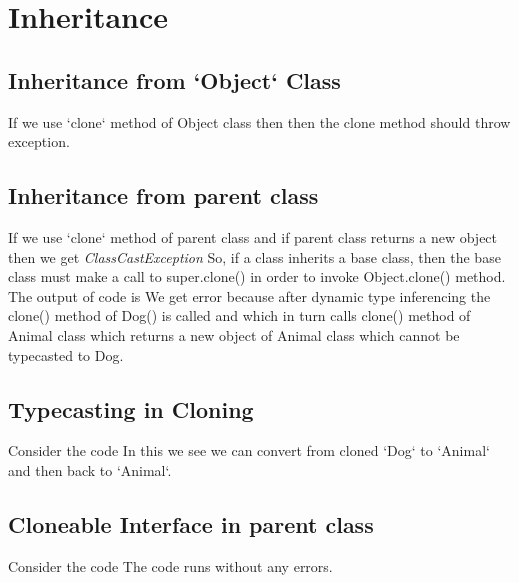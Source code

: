 \section{Inheritance \label{section:inheritance}}
\subsection{Inheritance from `Object` Class\label{subsection:inheritanceObject}}
	If we use `clone` method of Object class then then the clone method should throw  exception. 
	

\subsection{Inheritance from parent class\label{subsection:inheritanceParent}}
	If we use `clone` method of parent class and if parent class returns a new object then we get \textit{ClassCastException}	
So, if a class inherits a base class, then the base class must make a call to super.clone() in order to invoke Object.clone() method. 
The output of code  is 
We get error because after dynamic type inferencing the clone() method of Dog() is called and which in turn calls clone() method of Animal class which returns a new object of Animal class which cannot be typecasted to Dog.
\subsection{Typecasting in Cloning\label{subsection:typecasting}}
Consider the code 
In this we see we can convert from cloned `Dog` to `Animal` and then back to `Animal`.

\subsection{Cloneable Interface in parent class\label{subsection:cloneableParent}}
Consider the code 
The code runs without any errors. 